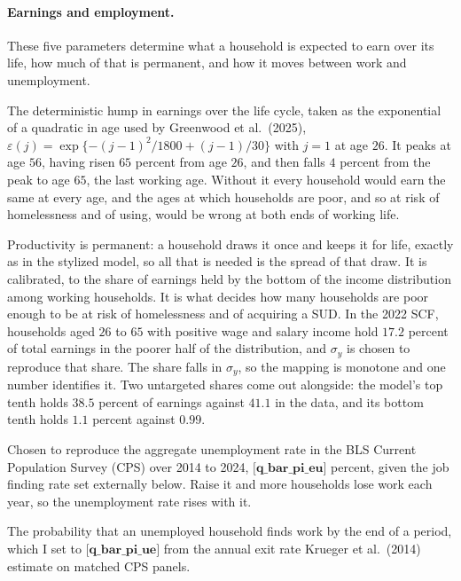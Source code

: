 \documentclass[10pt]{article}
\begin{document}
\paragraph{Earnings and employment.} These five parameters determine what a household is expected to earn over its life, how much of that is permanent, and how it moves between work and unemployment.
\begin{description}\setlength{\itemsep}{0.25em}\setlength{\parskip}{0em}
\item[$\varepsilon(j)$, the age profile of efficiency.] The deterministic hump in
earnings over the life cycle, taken as the exponential of a quadratic in age used by
Greenwood et al.\ (2025), $\varepsilon(j)=\exp\{-(j-1)^2/1800+(j-1)/30\}$ with $j=1$
at age $26$. It peaks at age $56$, having risen $65$ percent from age $26$, and then
falls $4$ percent from the peak to age $65$, the last working age. Without it every
household would earn the same at every age, and the ages at which households are
poor, and so at risk of homelessness and of using, would be wrong at both ends of
working life.

\item[$\sigma_y$, the dispersion of productivity.] Productivity is
permanent: a household draws it once and keeps it for life, exactly as in the
stylized model, so all that is needed is the spread of that draw.
It is calibrated, to the share of earnings held by the bottom of the
income distribution among working households. It is what decides how many households
are poor enough to be at risk of homelessness and of acquiring a SUD. In the 2022
SCF, households aged $26$ to $65$ with positive wage and
salary income hold $17.2$ percent of total earnings in the poorer half of the
distribution, and $\sigma_y$ is chosen to reproduce that share. The share falls in
$\sigma_y$, so the mapping is monotone and one number identifies it. Two untargeted shares come out alongside: the model's top tenth holds $38.5$ percent of
earnings against $41.1$ in the data, and its bottom tenth holds $1.1$ percent against
$0.99$.

\item[$\bar\pi^{eu}$, the job separation rate.] Chosen to reproduce the aggregate
unemployment rate in the BLS Current Population Survey (CPS) over 2014 to 2024,
$\textbf{[q_bar_pi_eu]}$ percent, given the
job finding rate set externally below. Raise it and more households lose work each year, so the unemployment rate rises with it.
\item[$\bar\pi^{ue}$, the annual job finding rate.] The probability that an unemployed household finds work
by the end of a period, which I set to $\textbf{[q_bar_pi_ue]}$ from the annual exit rate Krueger et
al.\ (2014) estimate on matched CPS panels.

\end{description}
\end{document}
